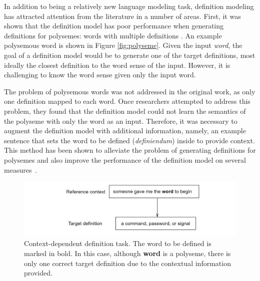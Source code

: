 In addition to being a relatively new language modeling task, definition
modeling has attracted attention from the literature in a number of areas.
First, it was shown that the definition model has poor performance when
generating definitions for polysemes: words with multiple definitions
\cite{gadetsky_conditional_2018}. An example polysemous word is shown in Figure
\ref{fig:polyseme}. Given the input \textit{word}, the goal of a definition
model would be to generate one of the target definitions, most ideally the
closest definition to the word sense of the input. However, it is challenging to
know the word sense given only the input word.

The problem of polysemous words was not addressed in the original work, as only one definition mapped to each word. Once researchers attempted to address this problem, they found that the definition model could not learn the semantics of the polyseme with only the word as an input. Therefore, it was necessary to augment the definition model with additional information, namely, an example sentence that sets the word to be defined (\textit{definiendum}) inside to
provide context. This method has been shown to alleviate the problem of generating definitions for polysemes and also improve the performance of the definition model on several measures~\cite{bevilacqua_generationary_2020,
    gadetsky_conditional_2018, mickus_mark_2019}.

\begin{figure}[h]
    \centering
    \includegraphics[width=.9\textwidth]{assets/figures/context.png}
    \caption{Context-dependent definition task. The word to be defined is marked
        in bold. In this case, although \textbf{word} is a polyseme, there is only
        one correct target definition due to the contextual information provided.}
    \label{fig:context_poly}
\end{figure}

